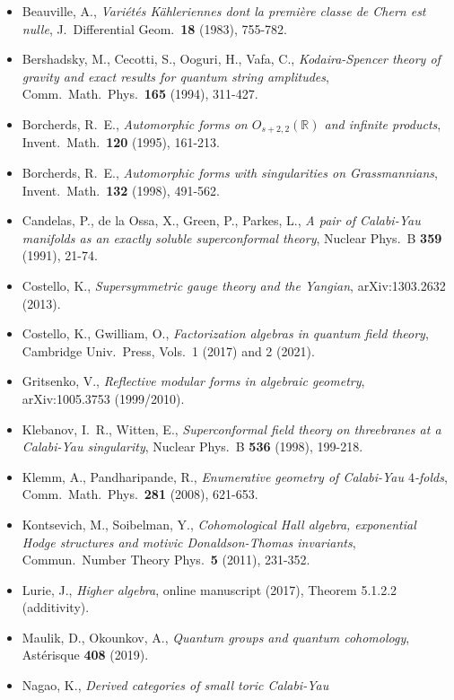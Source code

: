 \documentclass[11pt]{article}
\begin{document}
\begin{itemize}
\item Beauville, A., \emph{Vari\'et\'es K\"ahleriennes dont la premi\`ere
      classe de Chern est nulle}, J.\ Differential Geom.\ \textbf{18}
      (1983), 755-782.
\item Bershadsky, M., Cecotti, S., Ooguri, H., Vafa, C.,
      \emph{Kodaira-Spencer theory of gravity and exact results for
      quantum string amplitudes}, Comm.\ Math.\ Phys.\ \textbf{165}
      (1994), 311-427.
\item Borcherds, R.\ E., \emph{Automorphic forms on $O_{s+2,2}(\mathbb{R})$
      and infinite products}, Invent.\ Math.\ \textbf{120} (1995), 161-213.
\item Borcherds, R.\ E., \emph{Automorphic forms with singularities on
      Grassmannians}, Invent.\ Math.\ \textbf{132} (1998), 491-562.
\item Candelas, P., de la Ossa, X., Green, P., Parkes, L., \emph{A pair of
      Calabi-Yau manifolds as an exactly soluble superconformal theory},
      Nuclear Phys.\ B \textbf{359} (1991), 21-74.
\item Costello, K., \emph{Supersymmetric gauge theory and the Yangian},
      arXiv:1303.2632 (2013).
\item Costello, K., Gwilliam, O., \emph{Factorization algebras in quantum
      field theory}, Cambridge Univ.\ Press, Vols.\ 1 (2017) and 2 (2021).
\item Gritsenko, V., \emph{Reflective modular forms in algebraic geometry},
      arXiv:1005.3753 (1999/2010).
\item Klebanov, I.\ R., Witten, E., \emph{Superconformal field theory on
      threebranes at a Calabi-Yau singularity}, Nuclear Phys.\ B
      \textbf{536} (1998), 199-218.
\item Klemm, A., Pandharipande, R., \emph{Enumerative geometry of
      Calabi-Yau $4$-folds}, Comm.\ Math.\ Phys.\ \textbf{281} (2008),
      621-653.
\item Kontsevich, M., Soibelman, Y., \emph{Cohomological Hall algebra,
      exponential Hodge structures and motivic Donaldson-Thomas
      invariants}, Commun.\ Number Theory Phys.\ \textbf{5} (2011), 231-352.
\item Lurie, J., \emph{Higher algebra}, online manuscript (2017),
      Theorem 5.1.2.2 (additivity).
\item Maulik, D., Okounkov, A., \emph{Quantum groups and quantum
      cohomology}, Ast\'erisque \textbf{408} (2019).
\item Nagao, K., \emph{Derived categories of small toric Calabi-Yau
}
\end{itemize}
\end{document}
